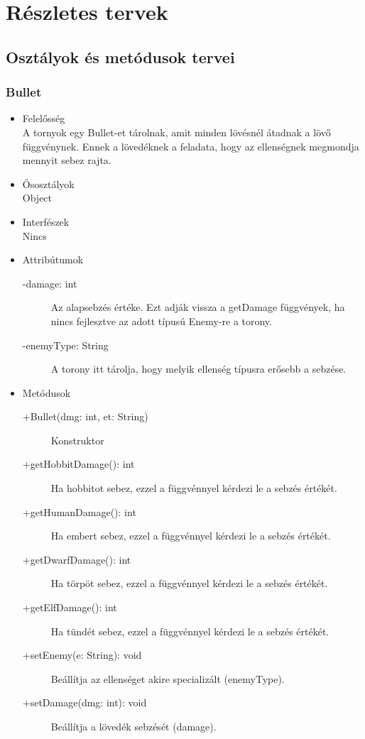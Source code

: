 %
\chapter{Részletes tervek}

\thispagestyle{fancy}

\section{Osztályok és metódusok tervei}

\subsection{Bullet}
\begin{itemize}
\item Felelősség\\
A tornyok egy Bullet-et tárolnak, amit minden lövésnél átadnak a lövő függvénynek. Ennek a lövedéknek a feladata, hogy az ellenségnek megmondja mennyit sebez rajta.
\item Ősosztályok\\
Object
\item Interfészek\\
Nincs
\item Attribútumok
	\begin{description}
		\item[-damage: int] Az alapsebzés értéke. Ezt adják vissza a getDamage függvények, ha nincs fejlesztve az adott típusú Enemy-re a torony. 
		\item[-enemyType: String] A torony itt tárolja, hogy melyik ellenség típusra erősebb a sebzése. 
	\end{description}
\item Metódusok
	\begin{description}
		\item[+Bullet(dmg: int, et: String)] Konstruktor
\item[+getHobbitDamage(): int] Ha hobbitot sebez, ezzel a függvénnyel kérdezi le a sebzés értékét. 
\item[+getHumanDamage(): int] Ha embert sebez, ezzel a függvénnyel kérdezi le a sebzés értékét.
\item[+getDwarfDamage(): int] Ha törpöt sebez, ezzel a függvénnyel kérdezi le a sebzés értékét.
\item[+getElfDamage(): int] Ha tündét sebez, ezzel a függvénnyel kérdezi le a sebzés értékét.
\item[+setEnemy(e: String): void] Beállítja az ellenséget akire specializált (enemyType).
\item[+setDamage(dmg: int): void] Beállítja a lövedék sebzését (damage).


\end{description}
\end{itemize}
